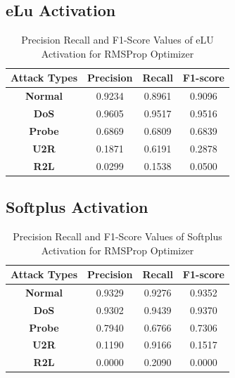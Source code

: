 \documentclass[12pt, a4paper]{report}
\begin{document}
\begin{appendices}
	\subsection{eLu Activation}
 	  \begin{table}[h]
		\centering
		\captionsetup{justification=centering,margin=2cm}
		\begin{tabular}{|c|c|c|c|}
		\hline
		\textbf{Attack Types} & \textbf{Precision} & \textbf{Recall} & \textbf{F1-score} \\ \hline
		\textbf{Normal}       & 0.9234             & 0.8961          & 0.9096            \\ \hline
		\textbf{DoS}          & 0.9605             & 0.9517          & 0.9516            \\ \hline
		\textbf{Probe}        & 0.6869             & 0.6809          & 0.6839            \\ \hline
		\textbf{U2R}          & 0.1871             & 0.6191          & 0.2878            \\ \hline
		\textbf{R2L}          & 0.0299             & 0.1538          & 0.0500            \\ \hline
		\end{tabular}
		\caption{Precision Recall and F1-Score Values of eLU Activation for RMSProp Optimizer}
		\label{classification elu rms tflearn}
		\end{table} 
	
	\subsection{Softplus Activation}
 	  \begin{table}[h]
		\centering
		\captionsetup{justification=centering,margin=2cm}
		\begin{tabular}{|c|c|c|c|}
		\hline
		\textbf{Attack Types} & \textbf{Precision} & \textbf{Recall} & \textbf{F1-score} \\ \hline
		\textbf{Normal}       & 0.9329             & 0.9276          & 0.9352            \\ \hline
		\textbf{DoS}          & 0.9302             & 0.9439          & 0.9370            \\ \hline
		\textbf{Probe}        & 0.7940             & 0.6766          & 0.7306            \\ \hline
		\textbf{U2R}          & 0.1190             & 0.9166          & 0.1517            \\ \hline
		\textbf{R2L}          & 0.0000             & 0.2090          & 0.0000            \\ \hline
		\end{tabular}
		\caption{Precision Recall and F1-Score Values of Softplus Activation for RMSProp Optimizer}
		\label{classification softplus rms tflearn}
		\end{table} 
		\clearpage

\end{appendices}
\end{document}
